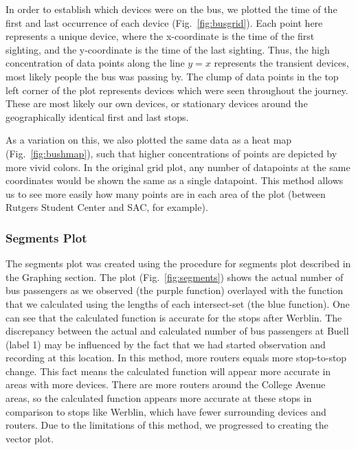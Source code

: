 In order to establish which devices were on the bus, we plotted the time of the first and last occurrence of each device (Fig.~\ref{fig:busgrid}).
Each point here represents a unique device, where the x-coordinate is the time of the first sighting, and the y-coordinate is the time of the last sighting.
Thus, the high concentration of data points along the line \(y=x\) represents the transient devices, most likely people the bus was passing by.
The clump of data points in the top left corner of the plot represents devices which were seen throughout the journey.
These are most likely our own devices, or stationary devices around the geographically identical first and last stops.

As a variation on this, we also plotted the same data as a heat map (Fig.~\ref{fig:bushmap}), such that higher concentrations of points are depicted by more vivid colors.
In the original grid plot, any number of datapoints at the same coordinates would be shown the same as a single datapoint.
This method allows us to see more easily how many points are in each area of the plot (between Rutgers Student Center and SAC, for example).

\subsubsection*{Segments Plot}
The segments plot was created using the procedure for segments plot described in the Graphing section.
The plot (Fig.~\ref{fig:segments}) shows the actual number of bus passengers as we observed (the purple function) overlayed with the function that we calculated using the lengths of each intersect-set (the blue function).
One can see that the calculated function is accurate for the stops after Werblin.
The discrepancy between the actual and calculated number of bus passengers at Buell (label 1) may be influenced by the fact that we had started observation and recording at this location. In this method, more routers equals more stop-to-stop change.
This fact means the calculated function will appear more accurate in areas with more devices.
There are more routers around the College Avenue areas, so the calculated function appears more accurate at these stops in comparison to stops like Werblin, which have fewer surrounding devices and routers.
Due to the limitations of this method, we progressed to creating the vector plot.

